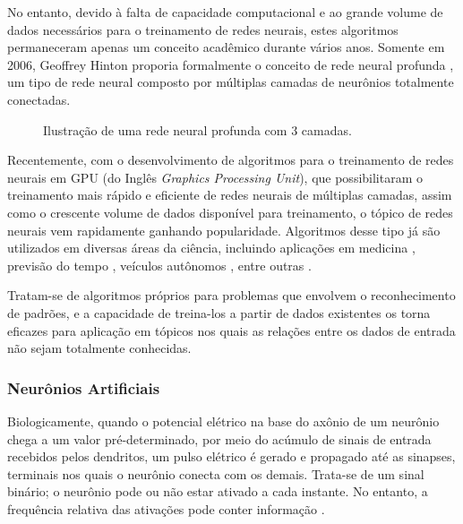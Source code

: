 No entanto, devido à falta de capacidade computacional e ao grande volume de dados necessários para o treinamento de redes neurais, estes algoritmos permaneceram apenas um conceito acadêmico durante vários anos.
Somente em 2006, Geoffrey Hinton proporia formalmente o conceito de rede neural profunda \cite{hintonFastLearningAlgorithm2006}, um tipo de rede neural composto por múltiplas camadas de neurônios totalmente conectadas.

\begin{figure}[ht]
    \centering
    
    \caption{Ilustração de uma rede neural profunda com 3 camadas.}
    \label{fig:dnn}
\end{figure}

Recentemente, com o desenvolvimento de algoritmos para o treinamento de redes neurais em GPU (do Inglês \textit{Graphics Processing Unit}), que possibilitaram o treinamento mais rápido e eficiente de redes neurais de múltiplas camadas, assim como o crescente volume de dados disponível para treinamento, o tópico de redes neurais vem rapidamente ganhando popularidade.
Algoritmos desse tipo já são utilizados em diversas áreas da ciência, incluindo aplicações em medicina \cite{hannunCardiologistLevelArrhythmiaDetection2019,phamPredictingHealthcareTrajectories2017,houDeepSFDeepConvolutional2018}, previsão do tempo \cite{akramSequenceSequenceWeather2016}, veículos autônomos \cite{bojarskiEndEndLearning2016,peddagollaLaneDetectionAutonomous}, entre outras \cite{abiodunStateoftheartArtificialNeural2018}.

Tratam-se de algoritmos próprios para problemas que envolvem o reconhecimento de padrões, e a capacidade de treina-los a partir de dados existentes os torna eficazes para aplicação em tópicos nos quais as relações entre os dados de entrada não sejam totalmente conhecidas.

\subsubsection{Neurônios Artificiais}

Biologicamente, quando o potencial elétrico na base do axônio de um neurônio chega a um valor pré-determinado, por meio do acúmulo de sinais de entrada recebidos pelos dendritos, um pulso elétrico é gerado e propagado até as sinapses, terminais nos quais o neurônio conecta com os demais.
Trata-se de um sinal binário; o neurônio pode ou não estar ativado a cada instante. No entanto, a frequência relativa das ativações pode conter informação \cite{behnkeHierarchicalNeuralNetworks2003}.

